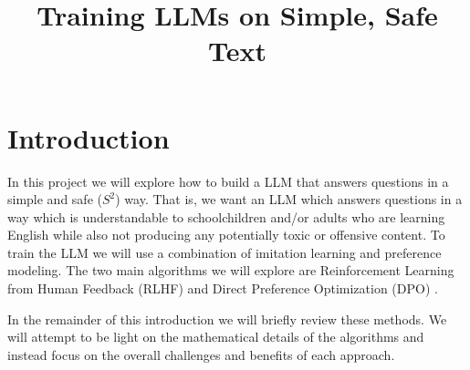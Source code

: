 \documentclass[11pt, oneside]{article}   	%
\title{Training LLMs on Simple, Safe Text}
\begin{document}
\maketitle
\tableofcontents
\section{Introduction}

In this project we will explore how to build a LLM that answers questions in a simple and safe ($S^{2}$) way.
That is, we want an LLM which answers questions in a way which is understandable to schoolchildren and/or adults who are learning English while also not producing any potentially toxic or offensive content.
To train the LLM we will use a combination of imitation learning and preference modeling.
The two main algorithms we will explore are Reinforcement Learning from Human Feedback (RLHF) \cite{ouyang2022training,bai2022training} and Direct Preference Optimization (DPO) \cite{rafailov2023direct}. 

In the remainder of this introduction we will briefly review these methods.
We will attempt to be light on the mathematical details of the algorithms and instead focus on the overall challenges and benefits of each approach.
 
\end{document}
